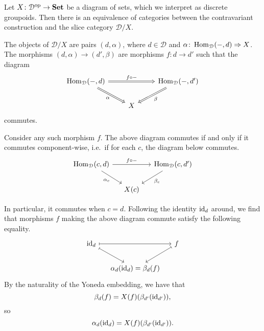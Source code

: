 \documentclass[main.tex]{subfiles}
\begin{document}
\begin{example}
  Let $X\colon \mathcal{D}^{\mathrm{op}} \to \mathbf{Set}$ be a diagram of sets, which we interpret as discrete groupoids. Then there is an equivalence of categories between the contravariant construction and the slice category $\mathcal{D}/X$.

  The objects of $\mathcal{D}/X$ are pairs $(d, \alpha)$, where $d \in \mathcal{D}$ and $\alpha\colon \operatorname{Hom}_{\mathcal{D}}(-, d) \Rightarrow X$. The morphisms $(d, \alpha) \to (d', \beta)$ are morphisms $f\colon d \to d'$ such that the diagram
  \begin{equation}
    \label{eq:natural_transformation_diagram}
    \begin{tikzcd}
      \Hom_{\mathcal{D}}(-, d)
      \arrow[rr, Rightarrow, "f \circ -"]
      \arrow[dr, swap, Rightarrow, "\alpha"]
      && \Hom_{\mathcal{D}}(-, d')
      \arrow[dl, Rightarrow, "\beta"]
      \\
      & X
    \end{tikzcd}
  \end{equation}
  commutes.

  Consider any such morphism $f$. The above diagram commutes if and only if it commutes component-wise, i.e.\ if for each $c$, the diagram below commutes.
  \begin{equation}
    \label{eq:commutativity_diagram}
    \begin{tikzcd}[column sep=small]
      \Hom_{\mathcal{D}}(c, d)
      \arrow[rr, "f \circ -"]
      \arrow[dr, swap, "\alpha_{c}"]
      && \Hom_{\mathcal{D}}(c, d')
      \arrow[dl, "\beta_{c}"]
      \\
      & X(c)
    \end{tikzcd}
  \end{equation}

  In particular, it commutes when $c = d$. Following the identity $\mathrm{id}_{d}$ around, we find that morphisms $f$ making the above diagram commute satisfy the following equality.
  \begin{equation*}
    \begin{tikzcd}[column sep=small]
      \id_{d}
      \arrow[rr, mapsto]
      \arrow[rd, mapsto]
      && f
      \arrow[dl, mapsto]
      \\
      & \alpha_{d}(\id_{d}) = \beta_{d}(f)
    \end{tikzcd}
  \end{equation*}
  By the naturality of the Yoneda embedding, we have that
  \begin{equation*}
    \beta_{d}(f) = X(f)(\beta_{d'}(\mathrm{id}_{d'})),
  \end{equation*}
  so
  \begin{equation}
    \label{eq:yoneda_naturality}
    \alpha_{d}(\mathrm{id}_{d}) = X(f)(\beta_{d'}(\mathrm{id}_{d'})).
  \end{equation}


\end{example}
\end{document}
